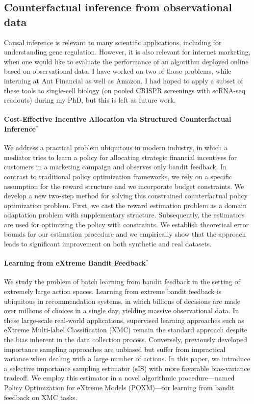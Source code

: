\subsection{Counterfactual inference from observational data}

Causal inference is relevant to many scientific applications, including for understanding gene regulation. However, it is also relevant for internet marketing, when one would like to evaluate the performance of an algorithm deployed online based on observational data. I have worked on two of those problems, while interning at Ant Financial as well as Amazon. I had hoped to apply a subset of these tools to single-cell biology (on pooled CRISPR screenings with scRNA-seq readouts) during my PhD, but this is left as future work. 

\paragraph{Cost-Effective Incentive Allocation via Structured Counterfactual Inference$^*$} We address a practical problem ubiquitous in modern industry, in which a mediator tries to learn a policy for allocating strategic financial incentives for customers in a marketing campaign and observes only bandit feedback. In contrast to traditional policy optimization frameworks, we rely on a specific assumption for the reward structure and we incorporate budget constraints. We develop a new two-step method for solving this constrained counterfactual policy optimization problem. First, we cast the reward estimation problem as a domain adaptation problem with supplementary structure. Subsequently, the estimators are used for optimizing the policy with constraints. We establish theoretical error bounds for our estimation procedure and we empirically show that the approach leads to significant improvement on both synthetic and real datasets.

\paragraph{Learning from eXtreme Bandit Feedback$^*$}
We study the problem of batch learning from bandit feedback in the setting of extremely large action spaces. Learning from extreme bandit feedback is ubiquitous in recommendation systems, in which billions of decisions are made over millions of choices in a single day, yielding massive observational data. In these large-scale real-world applications, supervised learning approaches such as eXtreme Multi-label Classification (XMC) remain the standard approach despite the bias inherent in the data collection process. Conversely, previously developed importance sampling approaches are unbiased but suffer from impractical variance when dealing with a large number of actions. In this paper, we introduce a selective importance sampling estimator (sIS) with more favorable bias-variance tradeoff. We employ this estimator in a novel algorithmic procedure—named Policy Optimization for eXtreme Models (POXM)—for learning from bandit feedback on XMC tasks. 





